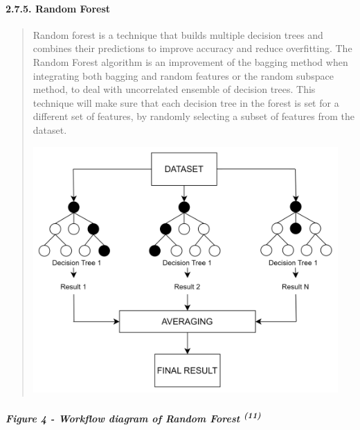 \documentclass[
]{article}
\begin{document}
\hypertarget{random-forest}{%
\paragraph{\texorpdfstring{\textbf{2.7.5. Random
Forest}}{2.7.5. Random Forest}}\label{random-forest}}

\begin{quote}
Random forest is a technique that builds multiple decision trees and
combines their predictions to improve accuracy and reduce overfitting.
The Random Forest algorithm is an improvement of the bagging method when
integrating both bagging and random features or the random subspace
method, to deal with uncorrelated ensemble of decision trees. This
technique will make sure that each decision tree in the forest is set
for a different set of features, by randomly selecting a subset of
features from the dataset.

\includegraphics[width=4.58626in,height=3.70313in]{vertopal_f239f640fefe43bb8bc0698cafd57825/media/image4.png}
\end{quote}

\hypertarget{figure-4---workflow-diagram-of-random-forest-11}{%
\subparagraph{\texorpdfstring{\textbf{Figure 4} - Workflow diagram of
Random Forest
\textsuperscript{(11)}}{Figure 4 - Workflow diagram of Random Forest (11)}}\label{figure-4---workflow-diagram-of-random-forest-11}}
\end{document}
